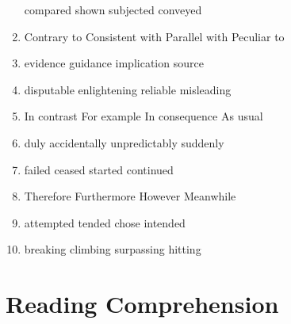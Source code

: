 \begin{enumerate}
\fourchoices
{compared}
{shown}
{subjected}
{conveyed}




\item

\fourchoices
{Contrary to}
{Consistent with}
{Parallel with}
{Peculiar to}



\item


\fourchoices
{evidence}
{guidance}
{implication}
{source}




\item

\fourchoices
{disputable}
{enlightening}
{reliable}
{misleading}



\item

\fourchoices
{In contrast}
{For example}
{In consequence}
{As usual}



\item

\fourchoices
{duly}
{accidentally}
{unpredictably}
{suddenly}



\item


\fourchoices
{failed}
{ceased}
{started}
{continued}




\item

\fourchoices
{Therefore}
{Furthermore}
{However}
{Meanwhile}



\item


\fourchoices
{attempted}
{tended}
{chose}
{intended}




\item


\fourchoices
{breaking}
{climbing}
{surpassing}
{hitting}

\end{enumerate}




\section{Reading Comprehension}



